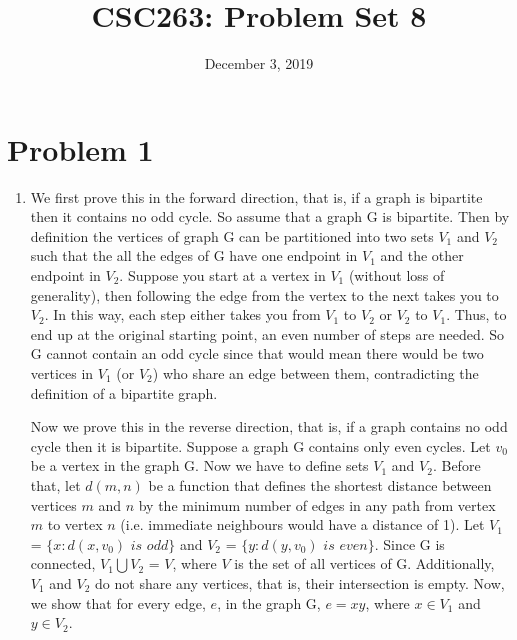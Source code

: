 \documentclass{article}
\title{CSC263: Problem Set 8}
\date{December 3, 2019}
\begin{document}
\maketitle

\section{Problem 1}

\begin{enumerate}[label=(\alph*)]

\item We first prove this in the forward direction, that is, if a graph is bipartite then it contains no odd cycle. So assume that a graph G is bipartite. Then by definition the vertices of graph G can be partitioned into two sets $V_1$ and $V_2$ such that the all the edges of G have one endpoint in $V_1$ and the other endpoint in $V_2$. Suppose you start at a vertex in $V_1$ (without loss of generality), then following the edge from the vertex to the next takes you to $V_2$. In this way, each step either takes you from $V_1$ to $V_2$ or $V_2$ to $V_1$. Thus, to end up at the original starting point, an even number of steps are needed. So G cannot contain an odd cycle since that would mean there would be two vertices in $V_1$ (or $V_2$) who share an edge between them, contradicting the definition of a bipartite graph.

Now we prove this in the reverse direction, that is, if a graph contains no odd cycle then it is bipartite. Suppose a graph G contains only even cycles. Let $v_0$ be a vertex in the graph G. Now we have to define sets $V_1$ and $V_2$. Before that, let $d(m,n)$ be a function that defines the shortest distance between vertices $m$ and $n$ by the minimum number of edges in any path from vertex $m$ to vertex $n$ (i.e. immediate neighbours would have a distance of 1). Let $V_1$ = $\{x : d(x,v_0)$ $is$ $odd\}$ and $V_2$ = $\{y : d(y,v_0)$ $is$ $even\}$. Since G is connected, $V_1 \bigcup V_2$ = $V$, where $V$ is the set of all vertices of G. Additionally, $V_1$ and $V_2$ do not share any vertices, that is, their intersection is empty. Now, we show that for every edge, $e$, in the graph G, $e = xy$, where $x \in V_1$ and $y \in V_2$.


\end{enumerate}
\end{document}

